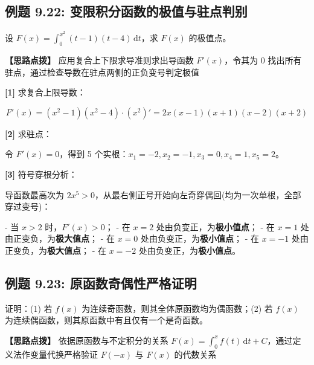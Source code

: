 \documentclass[11pt,a4paper,UTF8]{ctexart}
\begin{document}
\subsection{例题 9.22: 变限积分函数的极值与驻点判别}

设 $F(x) = \int_0^{x^2} (t-1)(t-4)\,\mathrm{d}t$，求 $F(x)$ 的极值点。

\textbf{\color{DeepPurple}【思路点拨】} 应用复合上下限求导准则求出导函数 $F'(x)$，令其为 0 找出所有驻点，通过检查导数在驻点两侧的正负变号判定极值


\begin{solbox}[分步推导与答题规范]
\textbf{[1]} 求复合上限导数：


\begin{equation*}
F'(x) = (x^2-1)(x^2-4) \cdot (x^2)' = 2x(x-1)(x+1)(x-2)(x+2)
\end{equation*}


\textbf{[2]} 求驻点：

令 $F'(x) = 0$，得到 5 个实根：$x_1 = -2, x_2 = -1, x_3 = 0, x_4 = 1, x_5 = 2$。

\textbf{[3]} 符号穿根分析：

导函数最高次为 $2x^5 > 0$，从最右侧正号开始向左奇穿偶回(均为一次单根，全部穿过变号)：

- 当 $x > 2$ 时，$F'(x) > 0$；
- 在 $x=2$ 处由负变正，为\textbf{极小值点}；
- 在 $x=1$ 处由正变负，为\textbf{极大值点}；
- 在 $x=0$ 处由负变正，为\textbf{极小值点}；
- 在 $x=-1$ 处由正变负，为\textbf{极大值点}；
- 在 $x=-2$ 处由负变正，为\textbf{极小值点}。
\end{solbox}


\subsection{例题 9.23: 原函数奇偶性严格证明}

证明：(1) 若 $f(x)$ 为连续奇函数，则其全体原函数均为偶函数；(2) 若 $f(x)$ 为连续偶函数，则其原函数中有且仅有一个是奇函数。

\textbf{\color{DeepPurple}【思路点拨】} 依据原函数与不定积分的关系 $F(x) = \int_0^x f(t)\,\mathrm{d}t + C$，通过定义法作变量代换严格验证 $F(-x)$ 与 $F(x)$ 的代数关系
\end{document}
